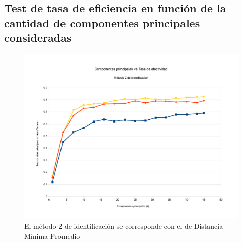 \subsection{Test de tasa de eficiencia en función de la cantidad de componentes principales consideradas}
\begin{figure}[H]{}
\centering
\includegraphics[scale=0.5]{graphs/componentesPrincipalesVsTasaDeEfectividadM2.pdf}
\caption{El método 2 de identificación se corresponde con el de Distancia Mínima Promedio}
\label{CPvsTE}
\end{figure}


